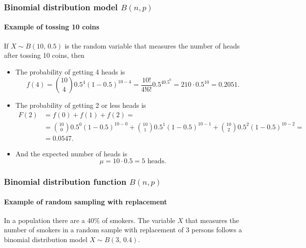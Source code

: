 \begin{frame}
\frametitle{Binomial distribution model $B(n,p)$}
\framesubtitle{Example of tossing 10 coins}
If $X\sim B(10,\,0.5)$ is the random variable that measures the number of heads after tossing 10 coins, then
\begin{itemize}
\item The probability of getting 4 heads is 
\[
f(4) = \binom{10}{4}0.5^4 (1-0.5)^{10-4} = \frac{10!}{4!6!}0.5^40.5^6 = 210\cdot 0.5^{10} = 0.2051.
\]
\item The probability of getting 2 or less heads is
\begin{align*}
F(2) &= f(0) +f(1) + f(2) =\\
&= \binom{10}{0}0.5^0 (1-0.5)^{10-0} + \binom{10}{1}0.5^1 (1-0.5)^{10-1} + \binom{10}{2}0.5^2 (1-0.5)^{10-2} =\\
&= 0.0547.
\end{align*}
\item And the expected number of heads is
\[ \mu = 10\cdot 0.5 = 5 \mbox{ heads}.\]
\end{itemize}
\end{frame}


\begin{frame}
\frametitle{Binomial distribution function $B(n,p)$}
\framesubtitle{Example of random sampling with replacement}
In a population there are a 40\% of smokers. 
The variable $X$ that measures the number of smokers in a random sample with replacement of 3 persons follows a
binomial distribution model $X\sim B(3,\,0.4)$.

\begin{center}
\end{center}

\end{frame}


